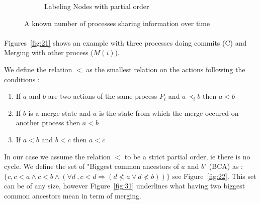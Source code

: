 \begin{figure}[H]
\begin{subfigure}[b]{0.3\textwidth}
{
 }
 \caption{Labeling Nodes with partial order}  \label{fig:23}
\end{subfigure}
\caption{A known number of processes sharing information over time}
\end{figure}

\paragraph{} Figures~\ref{fig:21} shows an example with three processes doing commits (C) and Merging with other process ($M(i)$). 
\begin{definition} We define the relation $<$ as the smallest relation on the actions following the conditions :
 \begin{enumerate}
  \item If $a$ and $b$ are two actions of the same process $P_i$ and $a \prec_i b$ then $a < b$
  \item If $b$ is a merge state and $a$ is the state from which the merge occured on another process then $a<b$
  \item If $a< b$ and $b<c$ then $a<c$ 
 \end{enumerate}
\end{definition}
In our case we assume the relation $<$ to be a strict partial order, ie there is no cycle. We define the set of "Biggest common ancestors of $a$ and $b$" (BCA) as : $\{c, 
c < a 
\wedge 
c < b 
\wedge 
\left ( 
\forall d\ ,
c < d \Rightarrow \left ( d \nless a \vee d \nless b \right )
\right )
\}$ see Figure~\ref{fig:22}. This set can be of any size, however Figure~\ref{fig:31} underlines what having two biggest common ancestors mean in term of merging. 
